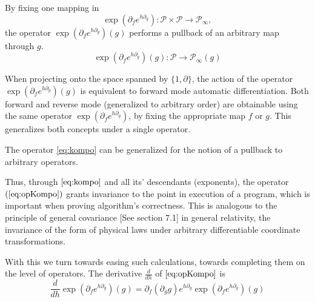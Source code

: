\documentclass[smallcondensed]{svjour3}
\newcommand{\dP}{\mathcal{P}}
\newcommand{\D}{\partial}
\begin{document}
 By fixing one mapping in  
 \begin{equation}\label{eq:opGenKompo}
\exp(\D_fe^{h\D_g}): \dP\times\dP\to\dP_\infty,
 \end{equation}
 the operator $\exp(\D_fe^{h\D_g})(g)$ performs a pullback of an arbitrary map through $g$. 
  \begin{equation}\label{eq:opKompo}
  \exp(\D_fe^{h\D_g})(g): \dP\to\dP_\infty(g)
  \end{equation}
 \begin{remark}[Unified AD]\label{trd:reverseForward}
 When projecting onto the space spanned by $\{1,\D\}$, the action of the
 operator $\exp(\D_fe^{h\D_g})(g)$ is equivalent to forward \cite{PcAD} mode
 automatic differentiation. Both forward \cite{PcAD} and reverse
 \cite{ReverseAD} mode (generalized to arbitrary order) are obtainable using the
 same operator $\exp(\D_fe^{h\D_g})$, by fixing the appropriate map $f$ or $g$.
 This generalizes both concepts under a single operator.
   
 \end{remark}
 \begin{remark}
 The operator \eqref{eq:kompo} can be generalized for the notion of a pullback to arbitrary operators.
 \end{remark}
 
 Thus, through $\eqref{eq:kompo}$ and all its' descendants (exponents), the
 operator $(\ref{eq:opKompo})$ grants invariance to the point in execution of a
 program, which is important when proving algorithm's correctness. This is
 analogous to the principle of general covariance \cite{GeneralCovariance}[See
 section 7.1] in general relativity, the invariance of the form of physical laws
 under arbitrary differentiable coordinate transformations. 
 
 With this we turn towards easing such calculations, towards completing them on the level of operators. The derivative $\frac{d}{dh}$ of $\eqref{eq:opKompo}$ is
 \begin{equation}\label{eq:dexp}
 \frac{d}{dh}\exp(\D_fe^{h\D_g})(g)=\D_f(\D_gg)e^{h\D_g}\exp(\D_fe^{h\D_g})(g)
 \end{equation}
 
\end{document}
